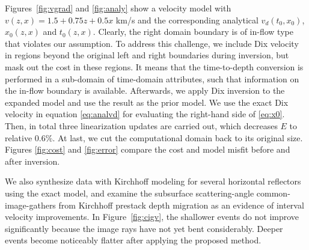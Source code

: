 Figures~\ref{fig:vgrad} and \ref{fig:analy} show a velocity model with $v (z,x) = 1.5 + 0.75 z + 0.5 x$ km/s and 
the corresponding analytical $v_d (t_0,x_0)$, $x_0 (z,x)$ and $t_0 (z,x)$. Clearly, the right domain boundary is 
of in-flow type that violates our assumption. To address this challenge, we include Dix velocity 
in regions beyond the original left and right boundaries during inversion, but mask out the cost in these regions. 
It means that the time-to-depth conversion is performed in a sub-domain of time-domain attributes, such that 
information on the in-flow boundary is available. Afterwards, we apply Dix inversion to the expanded model and 
use the result as the prior model. We use the exact Dix velocity in equation \ref{eq:analvd} 
for evaluating the right-hand side of \ref{eq:x0}. Then, in total three linearization updates are carried 
out, which decreases $E$ to relative $0.6\%$.  At last, we cut the computational domain back to its 
original size. Figures \ref{fig:cost} and \ref{fig:error} compare the cost and model misfit before and after 
inversion.

We also synthesize data with Kirchhoff modeling \cite[]{haddon} for several horizontal reflectors using the exact 
model, and examine the subsurface scattering-angle common-image-gathers from Kirchhoff prestack depth 
migration \cite[]{xu} as an evidence of interval velocity improvements. In 
Figure~\ref{fig:cigv}, the shallower events do not improve significantly because the image rays have not yet bent 
considerably. Deeper events become noticeably 
flatter after applying the proposed method.

